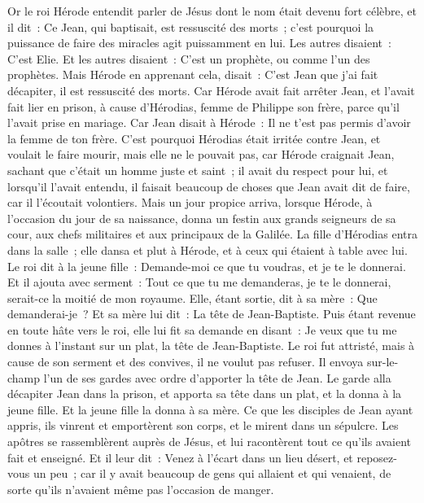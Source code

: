 \begin{multicols}{2}
Or le roi Hérode entendit parler de Jésus dont le nom était devenu fort célèbre, et il dit~: Ce Jean, qui baptisait, est ressuscité des morts~; c'est pourquoi la puissance de faire des miracles agit puissamment en lui.
Les autres disaient~: C'est Elie. Et les autres disaient~: C'est un prophète, ou comme l'un des prophètes.
Mais Hérode en apprenant cela, disait~: C'est Jean que j'ai fait décapiter, il est ressuscité des morts.
Car Hérode avait fait arrêter Jean, et l'avait fait lier en prison, à cause d'Hérodias, femme de Philippe son frère, parce qu'il l'avait prise en mariage.
Car Jean disait à Hérode~: Il ne t'est pas permis d'avoir la femme de ton frère.
C'est pourquoi Hérodias était irritée contre Jean, et voulait le faire mourir,
mais elle ne le pouvait pas, car Hérode craignait Jean, sachant que c'était un homme juste et saint~; il avait du respect pour lui, et lorsqu'il l'avait entendu, il faisait beaucoup de choses que Jean avait dit de faire, car il l'écoutait volontiers.
 Mais un jour propice arriva, lorsque Hérode, à l'occasion du jour de sa naissance, donna un festin aux grands seigneurs de sa cour, aux chefs militaires et aux principaux de la Galilée.
La fille d'Hérodias entra dans la salle~; elle dansa et plut à Hérode, et à ceux qui étaient à table avec lui. Le roi dit à la jeune fille~: Demande-moi ce que tu voudras, et je te le donnerai.
Et il ajouta avec serment~: Tout ce que tu me demanderas, je te le donnerai, serait-ce la moitié de mon royaume.
Elle, étant sortie, dit à sa mère~: Que demanderai-je~? Et sa mère lui dit~: La tête de Jean-Baptiste.
Puis étant revenue en toute hâte vers le roi, elle lui fit sa demande en disant~: Je veux que tu me donnes à l'instant sur un plat, la tête de Jean-Baptiste.
Le roi fut attristé, mais à cause de son serment et des convives, il ne voulut pas refuser.
Il envoya sur-le-champ l'un de ses gardes avec ordre d'apporter la tête de Jean.
Le garde alla décapiter Jean dans la prison, et apporta sa tête dans un plat, et la donna à la jeune fille. Et la jeune fille la donna à sa mère.
Ce que les disciples de Jean ayant appris, ils vinrent et emportèrent son corps, et le mirent dans un sépulcre.
Les apôtres se rassemblèrent auprès de Jésus, et lui racontèrent tout ce qu'ils avaient fait et enseigné.
Et il leur dit~: Venez à l'écart dans un lieu désert, et reposez-vous un peu~; car il y avait beaucoup de gens qui allaient et qui venaient, de sorte qu'ils n'avaient même pas l'occasion de manger.

\end{multicols}

